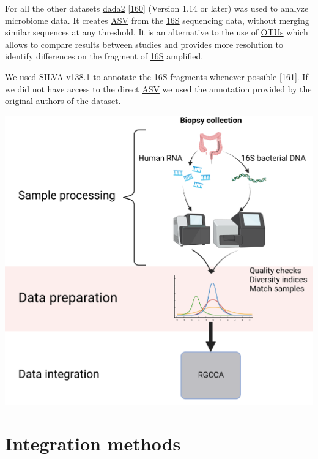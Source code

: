 \documentclass[
  12pt,
  a4paper,
  twoside,
  openright]{book}
\let\origfigure\figure
\let\endorigfigure\endfigure
\renewenvironment{figure}[1][2] {
    \expandafter\origfigure\expandafter[!htbp]
} {
    \endorigfigure
}
\begin{document}
For all the other datasets \href{https://bioconductor.org/packages/dada2}{dada2} {[}\protect\hyperlink{ref-callahan2016}{160}{]} (Version 1.14 or later) was used to analyze microbiome data.
It creates \protect\hyperlink{acronyms_ASV}{ASV} from the \protect\hyperlink{acronyms_16S}{16S} sequencing data, without merging similar sequences at any threshold.
It is an alternative to the use of \protect\hyperlink{acronyms_OTUs}{OTUs} which allows to compare results between studies and provides more resolution to identify differences on the fragment of \protect\hyperlink{acronyms_16S}{16S} amplified.

We used SILVA v138.1 to annotate the \protect\hyperlink{acronyms_16S}{16S} fragments whenever possible {[}\protect\hyperlink{ref-quast2013}{161}{]}.
If we did not have access to the direct \protect\hyperlink{acronyms_ASV}{ASV} we used the annotation provided by the original authors of the dataset.

\begin{figure}
\includegraphics[width=1\linewidth]{images/workflow_integration2} \caption[Workflow of the analysis process.]{Workflow of the main analysis process of the thesis. It shows the biopsy collection, extraction of genetic and transcriptomic material, sequencing and analysis. Created with BioRender.com}\label{fig:workflow-process}
\end{figure}

\hypertarget{integration-methods}{%
\section{Integration methods}\label{integration-methods}}
\end{document}
